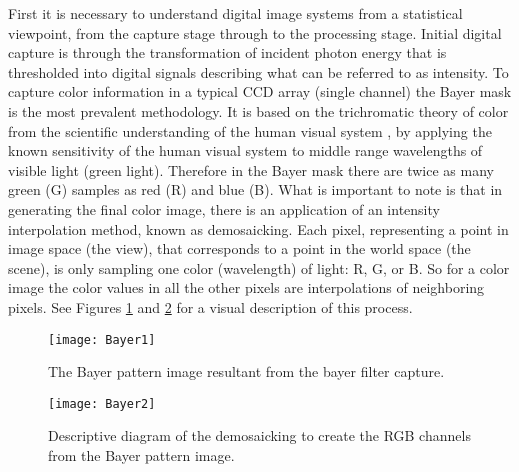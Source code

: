 %
%
%
%
%
%
%
%
%

%
%
%



First it is necessary to understand digital image systems from a statistical viewpoint, from the capture stage through to the processing stage. Initial digital capture is through the transformation of incident photon energy that is thresholded into digital signals describing what can be referred to as intensity. To capture color information in a typical CCD array (single channel) the Bayer mask is the most prevalent methodology. It is based on the trichromatic theory of color from the scientific understanding of the human visual system \cite{Palmer1999}, by applying the known sensitivity of the human visual system to middle range wavelengths of visible light (green light). Therefore in the Bayer mask there are twice as many green (G) samples as red (R) and blue (B). What is important to note is that in generating the final color image, there is an application of an intensity interpolation method, known as demosaicking. Each pixel, representing a point in image space (the view), that corresponds to a point in the world space (the scene), is only sampling one color (wavelength) of light: R, G, or B. So for a color image the color values in all the other pixels are interpolations of neighboring pixels. See Figures \ref{Bayer1} and \ref{Bayer2} for a visual description of this process.
 
\begin{figure}[!h]
\centering
\texttt{[image: Bayer1]}
\caption{The Bayer pattern image resultant from the bayer filter capture.}
\label{Bayer1}
\end{figure}
 
\begin{figure}[!h]
\centering
\texttt{[image: Bayer2]}
\caption{Descriptive diagram of the demosaicking to create the RGB channels from the Bayer pattern image.}
\label{Bayer2}
\end{figure}


